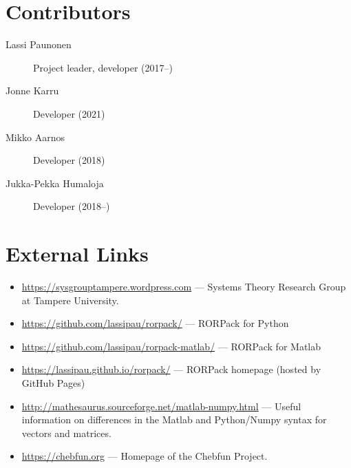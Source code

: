 \documentclass[11pt, a4paper]{amsart}
\theoremstyle{definition}
\numberwithin{equation}{section}
\begin{document}
\section{Contributors}


\begin{description}
  \item[Lassi Paunonen] Project leader, developer (2017--)
  \item[Jonne Karru] Developer (2021)
  \item[Mikko Aarnos] Developer (2018)
  \item[Jukka-Pekka Humaloja] Developer (2018--)
\end{description}



  \appendix

\section{External Links}

\begin{itemize}
  \item \href{https://sysgrouptampere.wordpress.com}{https://sysgrouptampere.wordpress.com} --- Systems Theory Research Group at Tampere University.
  \item  \href{https://github.com/lassipau/rorpack/}{https://github.com/lassipau/rorpack/} --- RORPack for Python
  \item  \href{https://github.com/lassipau/rorpack-matlab/}{https://github.com/lassipau/rorpack-matlab/} --- RORPack for Matlab
\item \href{https://lassipau.github.io/rorpack/}{https://lassipau.github.io/rorpack/}  --- RORPack homepage (hosted by GitHub Pages)
  \item \href{http://mathesaurus.sourceforge.net/matlab-numpy.html}{http://mathesaurus.sourceforge.net/matlab-numpy.html} --- Useful information on differences in the Matlab and Python/Numpy syntax for vectors and matrices.
  \item \href{https://chebfun.org}{https://chebfun.org} --- Homepage of the Chebfun Project.
\end{itemize}
\end{document}
